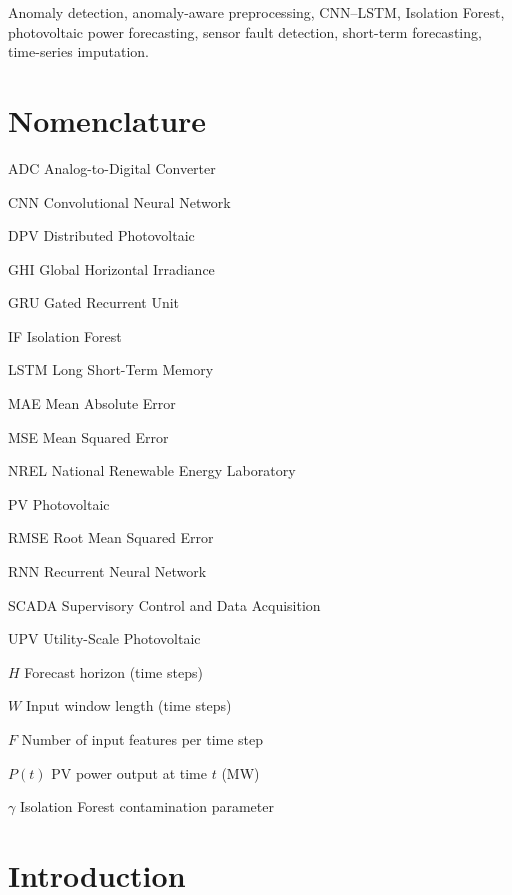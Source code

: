 \documentclass[conference]{IEEEtran}
\begin{document}
\begin{IEEEkeywords}
Anomaly detection, anomaly-aware preprocessing, CNN--LSTM, Isolation Forest, photovoltaic power forecasting, sensor fault detection, short-term forecasting, time-series imputation.
\end{IEEEkeywords}

\section*{Nomenclature}

\noindent
\begin{IEEEdescription}
\item[ADC] Analog-to-Digital Converter
\item[CNN] Convolutional Neural Network
\item[DPV] Distributed Photovoltaic
\item[GHI] Global Horizontal Irradiance
\item[GRU] Gated Recurrent Unit
\item[IF] Isolation Forest
\item[LSTM] Long Short-Term Memory
\item[MAE] Mean Absolute Error
\item[MSE] Mean Squared Error
\item[NREL] National Renewable Energy Laboratory
\item[PV] Photovoltaic
\item[RMSE] Root Mean Squared Error
\item[RNN] Recurrent Neural Network
\item[SCADA] Supervisory Control and Data Acquisition
\item[UPV] Utility-Scale Photovoltaic
\item[$H$] Forecast horizon (time steps)
\item[$W$] Input window length (time steps)
\item[$F$] Number of input features per time step
\item[$P(t)$] PV power output at time $t$ (MW)
\item[$\gamma$] Isolation Forest contamination parameter
\end{IEEEdescription}

\section{Introduction}
\end{document}
